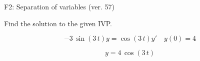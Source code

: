 \begin{exercise}
  \begin{exerciseTitle}F2: Separation of variables (ver. 57)\end{exerciseTitle}
  \begin{exerciseStatement}
    
Find the solution to the given IVP.

    
\[-3 \, \sin\left(3 \, t\right) y= \cos\left(3 \, t\right) y'\hspace{1em} y\left( 0 \right)= 4\]

  \end{exerciseStatement}
  \begin{exerciseAnswer}
    
\[y= 4 \, \cos\left(3 \, t\right)\]

  \end{exerciseAnswer}
\end{exercise}